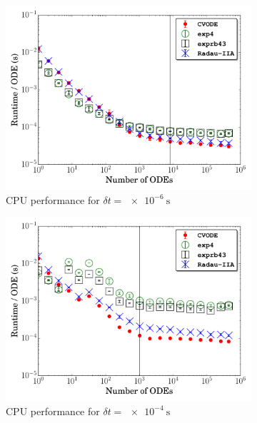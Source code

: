 \documentclass[preprint]{elsarticle}
\begin{document}
\begin{figure}[htb]
  \centering
  \begin{subfigure}{0.49\textwidth}
      \includegraphics[width=\linewidth]{CH4_1e-06_cpu.pdf}
      \caption{CPU performance for $\delta t = \SI{e-6}{\second}$}
      \label{F:ch4_cpu_perf_small}
  \end{subfigure}
  \begin{subfigure}{0.49\textwidth}
      \includegraphics[width=\linewidth]{CH4_1e-04_cpu.pdf}
      \caption{CPU performance for $\delta t = \SI{e-4}{\second}$}
      \label{F:ch4_cpu_perf_large}
  \end{subfigure}\\
  \begin{subfigure}{0.49\textwidth}

\end{subfigure}
\end{figure}
\end{document}
